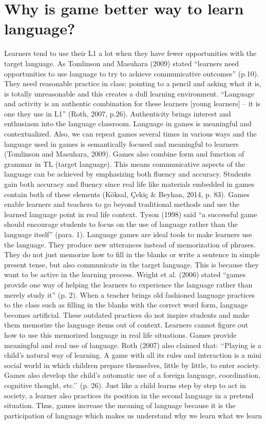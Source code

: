 \documentclass[10pt,twoside,english,a4paper]{article}
\begin{document}
\section{Why is game better way to learn language?} \label{ina}
Learners tend to use their  L1 a lot when they have fewer opportunities  with  the target language. As Tomlinson and Masuhara (2009)  stated  “learners  need  opportunities  to  use language  to  try  to  achieve  communicative  outcomes”  (p.10).  They  need reasonable practice  in class; pointing  to a pencil  and asking what  it is,  is totally unreasonable  and this creates  a dull learning environment. “Language and activity is an authentic combination for these learners [young learners] – it is one they use in L1” (Roth,  2007,  p.26).  Authenticity  brings  interest  and  enthusiasm  into  the  language  classroom.  
Language in games is meaningful and contextualized. Also, we can repeat games several times in various ways and the language used in games is semantically focused and meaningful to learners (Tomlinson and Masuhara,  2009). Games  also combine form  and function of grammar  in TL  (target language). This  means communicative aspects of the language can be achieved by emphasizing both fluency and accuracy. Students gain both accuracy and fluency since real life like materials embedded in games contain both of these elements (Köksal, Çekiç \& Beyhan,  2014, p. 83). Games enable learners and teachers to go beyond traditional methods and use the learned language point in real life context. Tyson (1998) said “a successful game should encourage students to focus on the use of language rather than the language itself” (para. 1). Language games are ideal tools to make learners use the language. They produce new utterances instead of memorization of phrases. They do not just memorize how to fill in the blanks or write a sentence in simple present tense, but also communicate in the target language. This is because they want to be active in the learning process. Wright et al. (2006) stated “games provide one way of helping the learners to experience the language rather than merely study it” (p. 2). When a teacher brings old fashioned language practices to the class such as filling in the blanks with the correct word form, language becomes artificial. These outdated practices do not inspire students and make them memorize the language items out of context. Learners cannot figure out how to use this memorized language in real life situations.  Games provide meaningful and  real  use of language. Roth (2007) also claimed that: ‘‘Playing is a child’s natural way of learning. A game with all its rules and interaction is a mini social world in which children prepare themselves, little  by little,  to enter society.  Games also develop  the child’s automatic  use of  a foreign  language, coordination, cognitive thought, etc.’’ (p. 26). Just like a child learns step by step to act in society, a learner also practices its position in the second language in a pretend situation. Thus, games increase the meaning of language because it is the participation of language which makes us understand why we learn what we learn\\
\end{document}
